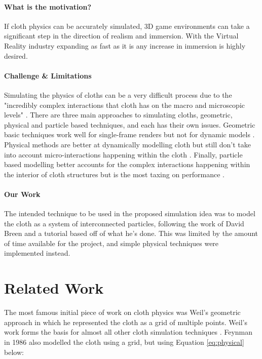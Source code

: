 \documentclass[conference,backref=page]{acmsiggraph}
\begin{document}
\paragraph{What is the motivation?}
If cloth physics can be accurately simulated, 3D game environments can take a significant step in the direction of realism and immersion. With the Virtual Reality industry expanding as fast as it is any increase in immersion is highly desired.

\paragraph{Challenge \& Limitations}
Simulating the physics of cloths can be a very difficult process due to the "incredibly complex interactions that cloth has on the macro and microscopic levels" \cite{kristopher}. There are three main approaches to simulating cloths, geometric, physical and particle based techniques, and each has their own issues. Geometric basic techniques work well for single-frame renders but not for dynamic models \cite{Weil}. Physical methods are better at dynamically modelling cloth but still don't take into account micro-interactions happening within the cloth \cite{Feynman}. Finally, particle based modelling better accounts for the complex interactions happening within the interior of cloth structures but is the most taxing on performance \cite{Breen}.

\paragraph{Our Work}
The intended technique to be used in the proposed simulation idea was to model the cloth as a system of interconnected particles, following the work of David Breen and a tutorial based off of what he's done. This was limited by the amount of time available for the project, and simple physical techniques were implemented instead.

\section{Related Work}
The most famous initial piece of work on cloth physics was Weil's geometric approach \cite{Weil} in which he represented the cloth as a grid of multiple points. Weil's work forms the basis for almost all other cloth simulation techniques \cite{Karthikeyan}. Feynman in 1986 also modelled the cloth using a grid, but using Equation \ref{eq:physical} below:
\end{document}
